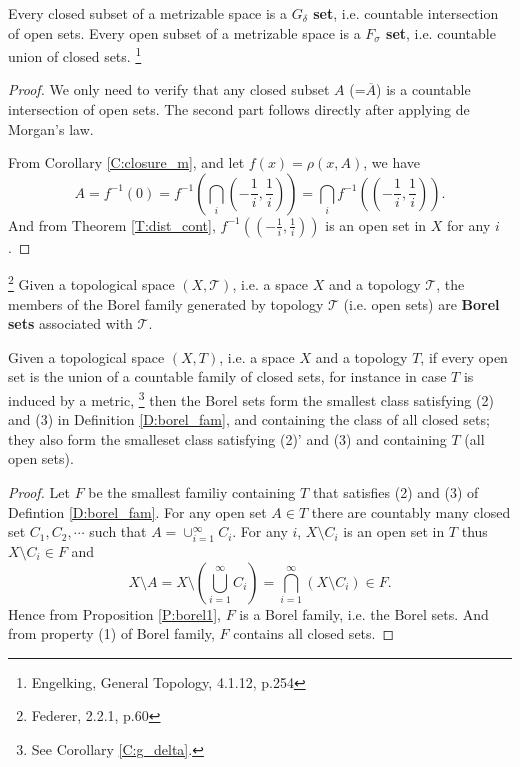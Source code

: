 \begin{corollary} \label{C:g_delta}
Every closed subset of a metrizable space is a \textbf{$G_{\delta}$ set}, 
i.e. countable intersection of open sets.
Every open subset of a metrizable space is a \textbf{$F_{\sigma}$ set}, 
i.e. countable union of closed sets.
\footnote{Engelking, General Topology, 4.1.12, p.254}
\end{corollary}
\begin{proof}
We only need to verify that any closed subset $A$ (=$\overline{A}$) is a countable
intersection of open sets. The second part follows directly after applying de 
Morgan's law. 

From Corollary \ref{C:closure_m}, and let $f(x)=\rho(x,A)$, we have 
\[
  A=f^{-1}(0)
   =f^{-1}\left( \bigcap_{i} \left( -\frac{1}{i}, \frac{1}{i} \right) \right)
   =\bigcap_{i} f^{-1}\left( \left( -\frac{1}{i}, \frac{1}{i} \right) \right).
\]
And from Theorem \ref{T:dist_cont}, 
$f^{-1}\left( \left( -\frac{1}{i}, \frac{1}{i} \right) \right)$ is an open set
in $X$ for any $i$.
\end{proof}


\begin{definition}
\footnote{Federer, 2.2.1, p.60}
Given a topological space $(X,\mathcal{T})$, i.e. a space $X$ and a 
topology $\mathcal{T}$, the members of the Borel family generated by 
topology $\mathcal{T}$ (i.e. open sets) are
\textbf{Borel sets} 
associated with $\mathcal{T}$.
\end{definition}


\begin{proposition} \label{P:borel}
Given a topological space $(X,T)$, i.e. a space $X$ and a topology $T$, if every
open set is the union of a countable family of closed sets, for instance in case
$T$ is induced by a metric, 
\footnote{See Corollary \ref{C:g_delta}.}
then the Borel sets form the smallest class
satisfying (2) and (3) in Definition \ref{D:borel_fam}, and containing the class
of all closed sets; they also form the smalleset class satisfying (2)' and (3)
and containing $T$ (all open sets).
\end{proposition}
\begin{proof}
Let $F$ be the smallest familiy containing $T$ that satisfies (2) and (3) of
Defintion \ref{D:borel_fam}. For any open set $A\in T$ there are countably many
closed set $C_1,C_2,\cdots$ such that $A=\cup_{i=1}^{\infty} C_i$. For any $i$,
$X\setminus C_i$ is an open set in $T$ thus $X\setminus C_i\in F$ and
\[
  X\setminus A = X\setminus \left( \bigcup_{i=1}^{\infty} C_i \right)
               = \bigcap_{i=1}^{\infty} \left( X\setminus C_i \right) \in F.
\]
Hence from Proposition \ref{P:borel1}, $F$ is a Borel family, i.e. the Borel
sets. And from property (1) of Borel family, $F$ contains all closed sets.
\end{proof}


